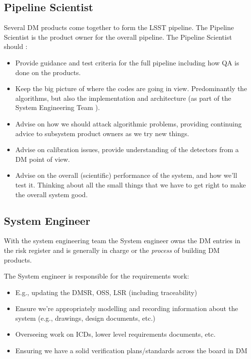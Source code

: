 \subsection{Pipeline Scientist \label{role:pipe}}
Several DM products come together to form the LSST pipeline. The Pipeline Scientist is the product owner for the overall pipeline. 
The Pipeline Scientist should :
\begin{itemize}
\item  Provide guidance and test criteria for the full pipeline including how QA is done on the products.  
\item Keep the big picture of where the codes are going in view. Predominantly the algorithms, but also the implementation and architecture (as part of the System Engineering Team ).


\item Advise on how we should attack algorithmic problems,  
providing continuing advice to subsystem product owners as we try new things. 

\item Advise on calibration issues, provide understanding of the detectors from a DM point of view. 

\item Advise on the overall (scientific) performance of the system, and how we'll test it.  Thinking about all the small things that we have to get right to make the overall system good.



\end{itemize}


\subsection{System Engineer \label{role:sysengineer}}
With the system engineering team  
 the System engineer 
 owns the DM entries in the risk register and is generally in charge or the {\em process} of building DM products. 

The System engineer  
is responsible for the requirements work:
\begin{itemize}
\item E.g., updating the DMSR, OSS, LSR (including traceability)
\item Ensure we’re appropriately modelling and recording information about the system (e.g.,
    drawings, design documents, etc.)
\item Overseeing work on ICDs, lower level requirements documents, etc.
\item Ensuring we have a solid verification plans/standards across the board in DM
\end{itemize}

